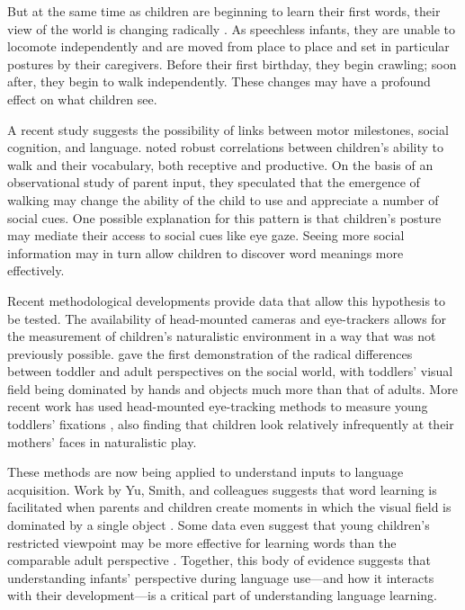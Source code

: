 \documentclass[10pt,letterpaper]{article}
\begin{document}
But at the same time as children are beginning to learn their first words, their view of the world is changing radically \cite{adolph2007}. As speechless infants, they are unable to locomote independently and are moved from place to place and set in particular postures by their caregivers. Before their first birthday, they begin crawling; soon after, they begin to walk independently. These changes may have a profound effect on what children see.

A recent study suggests the possibility of links between motor milestones, social cognition, and language.  noted robust correlations between children's ability to walk and their vocabulary, both receptive and productive. On the basis of an observational study of parent input, they speculated that the emergence of walking may change the ability of the child to use and appreciate a number of social cues. One possible explanation for this pattern is that children's posture may mediate their access to social cues like eye gaze. Seeing more social information may in turn allow children to discover word meanings more effectively.

Recent methodological developments provide data that allow this hypothesis to be tested. The availability of head-mounted cameras and eye-trackers allows for the measurement of children's naturalistic environment in a way that was not previously possible.  gave the first demonstration of the radical differences between toddler and adult perspectives on the social world, with toddlers' visual field being dominated by hands and objects much more than that of adults. More recent work has used head-mounted eye-tracking methods to measure young toddlers' fixations \cite{franchak2011}, also finding that children look relatively infrequently at their mothers' faces in naturalistic play.

These methods are now being applied to understand inputs to language acquisition. Work by Yu, Smith, and colleagues suggests that word learning is facilitated when parents and children create moments in which the visual field is dominated by a single object \cite{smith2011,yuinpress}. Some data even suggest that young children's restricted viewpoint may be more effective for learning words than the comparable adult perspective \cite{yurovsky2012}. Together, this body of evidence suggests that understanding infants' perspective during language use---and how it interacts with their development---is a critical part of understanding language learning.
\end{document}
